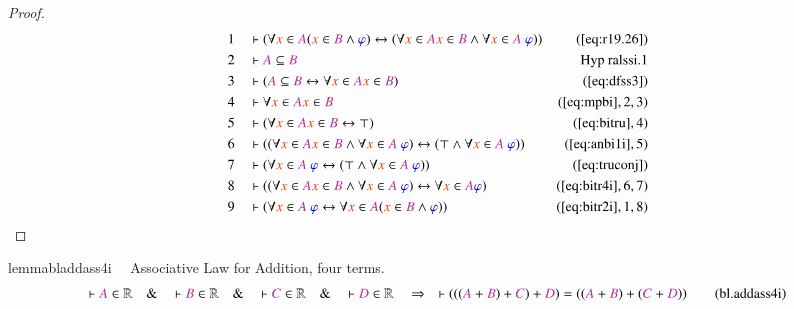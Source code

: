 \begin{proof}
\begin{align}
  1 &&  & \vdash ( \forall \msc{x} \in \mc{A} ( \msc{x} \in \mc{B} \wedge
      \mw{\varphi} ) \leftrightarrow ( \forall \msc{x} \in
      \mc{A} \msc{x} \in \mc{B} \wedge \forall \msc{x} \in
      \mc{A}~\mw{\varphi} )
      )&(\mbox{\ref{eq:r19.26}})\notag
  \\ 2 &&  & \vdash \mc{A} \subseteq
      \mc{B}&\text{Hyp~ralssi.1}\notag%
  \\ 3 &&  & \vdash ( \mc{A} \subseteq \mc{B} \leftrightarrow \forall \msc{x}
      \in \mc{A} \msc{x} \in \mc{B}
      )&(\mbox{\ref{eq:dfss3}})\notag
  \\ 4 &&  & \vdash \forall \msc{x} \in \mc{A} \msc{x} \in
      \mc{B}&(\mbox{\ref{eq:mpbi}},2,3)\notag
  \\ 5 &&  & \vdash ( \forall \msc{x} \in \mc{A} \msc{x} \in \mc{B}
      \leftrightarrow \top
      )&(\mbox{\ref{eq:bitru}},4)\notag
  \\ 6 &&  & \vdash ( ( \forall \msc{x} \in \mc{A} \msc{x} \in \mc{B} \wedge
      \forall \msc{x} \in \mc{A}~\mw{\varphi} )
      \leftrightarrow ( \top \wedge \forall \msc{x} \in
      \mc{A}~\mw{\varphi} )
      )&(\mbox{\ref{eq:anbi1i}},5)\notag
  \\ 7 &&  & \vdash ( \forall \msc{x} \in \mc{A}~\mw{\varphi} \leftrightarrow (
      \top \wedge \forall \msc{x} \in \mc{A}~\mw{\varphi} )
      )&(\mbox{\ref{eq:truconj}})\notag
  \\ 8 &&  & \vdash ( ( \forall \msc{x} \in \mc{A} \msc{x} \in \mc{B} \wedge
      \forall \msc{x} \in \mc{A}~\mw{\varphi} )
      \leftrightarrow \forall \msc{x} \in \mc{A}
      \mw{\varphi} )&(\mbox{\ref{eq:bitr4i}},6,7)\notag
  \\ 9 &&  & \vdash ( \forall \msc{x} \in \mc{A}~\mw{\varphi} \leftrightarrow
      \forall \msc{x} \in \mc{A} ( \msc{x} \in \mc{B}
      \wedge \mw{\varphi} )
      )&(\mbox{\ref{eq:bitr2i}},1,8)\notag
\end{align}
\end{proof}

\begin{restatable}{lemma}{bladdass4i}~~ Associative Law for Addition, four
terms.
\begin{align}
\vdash \mc{A} \in \mathbb{R}\quad\&\quad \vdash \mc{B} \in
    \mathbb{R}\quad\&\quad \vdash \mc{C} \in \mathbb{R}\quad\&\quad \vdash
    \mc{D} \in \mathbb{R}\quad\Rightarrow\quad \vdash ( ( ( \mc{A} + \mc{B} ) +
    \mc{C} ) + \mc{D} ) = ( ( \mc{A} + \mc{B} ) + ( \mc{C} + \mc{D} )
    )\label{eq:bl.addass4i}\tag{bl.addass4i}
\end{align}
\end{restatable}

